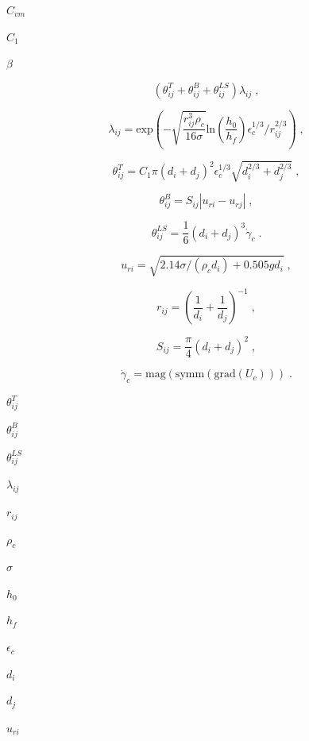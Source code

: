 \documentclass{article}
\begin{document}
$        C_{vm}      $
\pagebreak

$        C_1         $
\pagebreak

$        \beta       $
\pagebreak

\[
    \left( \theta_{ij}^{T} + \theta_{ij}^{B} + \theta_{ij}^{LS} \right)
    \lambda_{ij}\;,
\]
\pagebreak

\[
    \lambda_{ij} =
        \mathrm{exp}
        \left(
          - \sqrt{\frac{r_{ij}^3 \rho_c}{16 \sigma}}
            \mathrm{ln} \left(\frac{h_0}{h_f}\right)
            \epsilon_c^{1/3}/r_{ij}^{2/3}
        \right)\;,
\]
\pagebreak

\[
    \theta_{ij}^{T} =
        C_1 \pi (d_i + d_j)^{2} \epsilon_c^{1/3}
        \sqrt{d_{i}^{2/3} + d_{j}^{2/3}}\;,
\]
\pagebreak

\[
    \theta_{ij}^{B} = S_{ij} \left| u_{ri} - u_{rj} \right|\;,
\]
\pagebreak

\[
    \theta_{ij}^{LS} =
        \frac{1}{6} \left(d_i + d_j\right)^{3} \dot{\gamma}_c\;.
\]
\pagebreak

\[
    u_{ri} = \sqrt{2.14 \sigma / \left(\rho_c d_i \right) + 0.505 g d_i}\;,
\]
\pagebreak

\[
    r_{ij} = \left( \frac{1}{d_i} + \frac{1}{d_j} \right)^{-1}\;,
\]
\pagebreak

\[
    S_{ij} = \frac{\pi}{4} \left(d_i + d_j\right)^{2}\;,
\]
\pagebreak

\[
    \dot{\gamma}_c = \mathrm{mag}(\mathrm{symm}(\mathrm{grad}(U_c)))\;.
\]
\pagebreak

$        \theta_{ij}^{T}   $
\pagebreak

$        \theta_{ij}^{B}   $
\pagebreak

$        \theta_{ij}^{LS}  $
\pagebreak

$        \lambda_{ij}      $
\pagebreak

$        r_{ij}            $
\pagebreak

$        \rho_c            $
\pagebreak

$        \sigma            $
\pagebreak

$        h_0               $
\pagebreak

$        h_f               $
\pagebreak

$        \epsilon_c        $
\pagebreak

$        d_i               $
\pagebreak

$        d_j               $
\pagebreak

$        u_{ri}            $
\pagebreak
\end{document}
